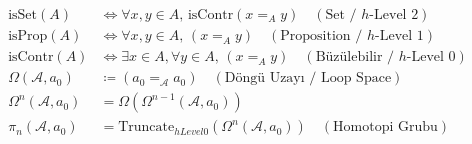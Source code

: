 \documentclass[11pt, a4paper]{article}
\begin{document}
\begin{align}
\text{isSet}(A) &\iff \forall x, y \in A, \, \text{isContr}(x =_A y) \quad (\text{Set / $h$-Level 2}) \\
\text{isProp}(A) &\iff \forall x, y \in A, \, (x =_A y) \quad (\text{Proposition / $h$-Level 1}) \\
\text{isContr}(A) &\iff \exists x \in A, \forall y \in A, \, (x =_A y) \quad (\text{Büzülebilir / $h$-Level 0}) \\
\Omega(\mathcal{A}, a_0) &\coloneqq (a_0 =_{\mathcal{A}} a_0) \quad (\text{Döngü Uzayı / Loop Space}) \\
\Omega^n(\mathcal{A}, a_0) &= \Omega(\Omega^{n-1}(\mathcal{A}, a_0)) \\
\pi_n(\mathcal{A}, a_0) &= \text{Truncate}_{hLevel 0}(\Omega^n(\mathcal{A}, a_0)) \quad (\text{Homotopi Grubu})
\end{align}
\end{document}
